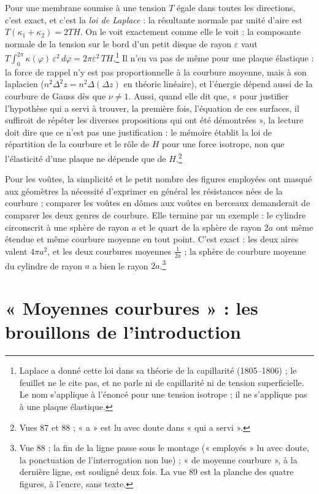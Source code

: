 \documentclass[11pt,a4paper]{article}
\begin{document}
Pour une membrane soumise à une tension $T$ égale dans toutes les directions,
c'est exact, et c'est la \emph{loi de Laplace} : la résultante normale par unité
d'aire est $T(\kappa_1 + \kappa_2) = 2TH$. On le voit exactement comme elle le
voit : la composante normale de la tension sur le bord d'un petit disque de
rayon $\varepsilon$ vaut $T\int_0^{2\pi}\kappa(\varphi)\,\varepsilon^2\,d\varphi =
2\pi\varepsilon^2\,TH$.\footnote{Laplace a donné cette loi dans sa théorie de la
capillarité (1805--1806) ; le feuillet ne le cite pas, et ne parle ni de
capillarité ni de tension superficielle. Le nom s'applique à l'énoncé pour une
tension isotrope ; il ne s'applique pas à une plaque élastique.} Il n'en va pas
de même pour une plaque élastique : la force de rappel n'y est pas
proportionnelle à la courbure moyenne, mais à son laplacien ($n^2\Delta^2 z =
n^2\Delta(\Delta z)$ en théorie linéaire), et l'énergie dépend aussi de la
courbure de Gauss dès que $\nu \neq 1$. Aussi, quand elle dit que, « pour
justifier l'hypothèse qui a servi à trouver, la première fois, l'équation de ces
surfaces, il suffiroit de répéter les diverses propositions qui ont été
démontrées », la lecture doit dire que ce n'est pas une justification : le
mémoire établit la loi de répartition de la courbure et le rôle de $H$ pour une
force isotrope, non que l'élasticité d'une plaque ne dépende que de
$H$.\footnote{Vues 87 et 88 ; « a » est lu avec doute dans « qui a servi ».}

Pour les voûtes, la simplicité et le petit nombre des figures employées ont
masqué aux géomètres la nécessité d'exprimer en général les résistances nées de
la courbure ; comparer les voûtes en dômes aux voûtes en berceaux demanderait de
comparer les deux genres de courbure. Elle termine par un exemple : le cylindre
circonscrit à une sphère de rayon $a$ et le quart de la sphère de rayon $2a$ ont
même étendue et même courbure moyenne en tout point. C'est exact : les deux
aires valent $4\pi a^2$, et les deux courbures moyennes $\frac1{2a}$ ; la sphère de
courbure moyenne du cylindre de rayon $a$ a bien le rayon $2a$.\footnote{Vue 88 ;
la fin de la ligne passe sous le montage (« employés » lu avec doute, la
ponctuation de l'interrogation non lue) ; « de moyenne courbure », à la dernière
ligne, est souligné deux fois. La vue 89 est la planche des quatre figures, à
l'encre, sans texte.}

\section*{« Moyennes courbures » : les brouillons de l'introduction}
\end{document}
